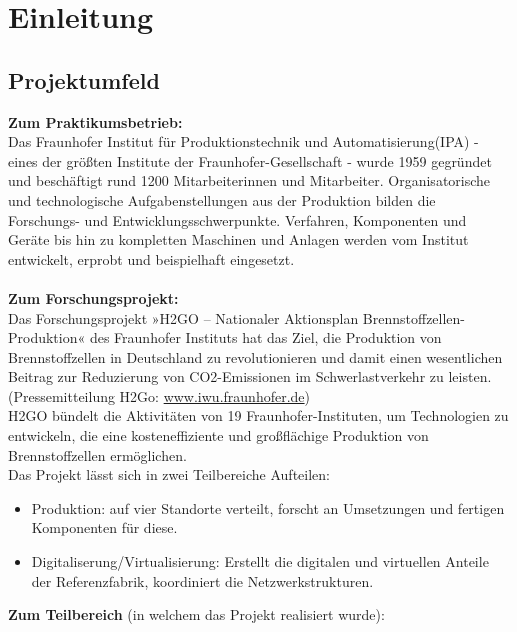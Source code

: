 \section{Einleitung}
\label{sec:Einleitung}


\subsection{Projektumfeld} 
\label{sec:Projektumfeld}
\textbf{Zum Praktikumsbetrieb:} \\
Das Fraunhofer Institut für Produktionstechnik und Automatisierung(IPA) - eines der größten Institute der Fraunhofer-Gesellschaft - wurde 1959 gegründet und beschäftigt rund 1200 Mitarbeiterinnen und Mitarbeiter. Organisatorische und technologische Aufgabenstellungen aus der Produktion bilden die Forschungs- und Entwicklungsschwerpunkte. Verfahren, Komponenten und Geräte bis hin zu kompletten Maschinen und Anlagen werden vom Institut entwickelt, erprobt und beispielhaft eingesetzt.\\
\\
\textbf{Zum Forschungsprojekt:}\\ Das Forschungsprojekt »H2GO – Nationaler Aktionsplan Brennstoffzellen-Produktion« des Fraunhofer Instituts hat das Ziel, die Produktion von Brennstoffzellen in Deutschland zu revolutionieren und damit einen wesentlichen Beitrag zur Reduzierung von CO2-Emissionen im Schwerlastverkehr zu leisten.\\
(Pressemitteilung H2Go: \href{https://www.iwu.fraunhofer.de/de/presse-und-medien/presseinformationen/PM-2022-ZV-Startschuss-fuer-das-Wasserstoffzeitalter-in-der-Lastenmobilitaet.html}{www.iwu.fraunhofer.de})\\
H2GO bündelt die Aktivitäten von 19 Fraunhofer-Instituten, um Technologien zu entwickeln, die eine kosteneffiziente und großflächige Produktion von Brennstoffzellen ermöglichen.\\
Das Projekt lässt sich in zwei Teilbereiche Aufteilen:
\begin{itemize}
	\item Produktion: auf vier Standorte verteilt, forscht an Umsetzungen und fertigen Komponenten für diese.
	\item Digitaliserung/Virtualisierung: Erstellt die digitalen und virtuellen Anteile der Referenzfabrik, koordiniert die Netzwerkstrukturen.
\end{itemize}
\textbf{Zum Teilbereich} (in welchem das Projekt realisiert wurde):\\
